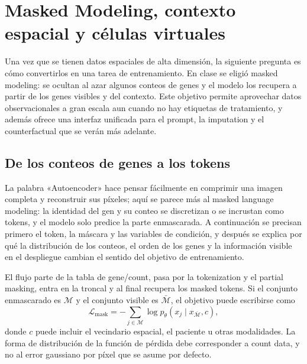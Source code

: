 \section{Masked Modeling, contexto espacial y células virtuales}

Una vez que se tienen datos espaciales de alta dimensión, la siguiente pregunta es cómo convertirlos en una tarea de entrenamiento. En clase se eligió masked modeling: se ocultan al azar algunos conteos de genes y el modelo los recupera a partir de los genes visibles y del contexto. Este objetivo permite aprovechar datos observacionales a gran escala aun cuando no hay etiquetas de tratamiento, y además ofrece una interfaz unificada para el prompt, la imputation y el counterfactual que se verán más adelante.

\subsection{De los conteos de genes a los tokens}

La palabra «Autoencoder» hace pensar fácilmente en comprimir una imagen completa y reconstruir sus píxeles; aquí se parece más al masked language modeling: la identidad del gen y su conteo se discretizan o se incrustan como tokens, y el modelo solo predice la parte enmascarada. A continuación se precisan primero el token, la máscara y las variables de condición, y después se explica por qué la distribución de los conteos, el orden de los genes y la información visible en el despliegue cambian el sentido del objetivo de entrenamiento.


El flujo parte de la tabla de gene/count, pasa por la tokenization y el partial masking, entra en la troncal y al final recupera los masked tokens. Si el conjunto enmascarado es $\mathcal{M}$ y el conjunto visible es $\bar{\mathcal{M}}$, el objetivo puede escribirse como
\[
\mathcal{L}_{\mathrm{mask}}
=-\sum_{j\in\mathcal{M}}
\log p_\theta(x_j\mid x_{\bar{\mathcal{M}}},c),
\]
donde $c$ puede incluir el vecindario espacial, el paciente u otras modalidades. La forma de distribución de la función de pérdida debe corresponder a count data, y no al error gaussiano por píxel que se asume por defecto.


